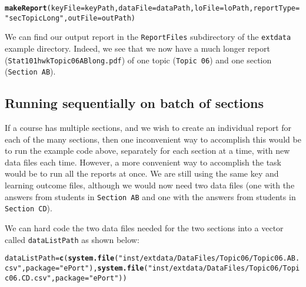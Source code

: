 \documentclass{article}\usepackage[]{graphicx}\usepackage[]{color}
\makeatletter
\newcommand{\hlstr}[1]{\textcolor[rgb]{0.192,0.494,0.8}{#1}}%
\newcommand{\hlstd}[1]{\textcolor[rgb]{0.345,0.345,0.345}{#1}}%
\newcommand{\hlkwb}[1]{\textcolor[rgb]{0.69,0.353,0.396}{#1}}%
\newcommand{\hlkwc}[1]{\textcolor[rgb]{0.333,0.667,0.333}{#1}}%
\newcommand{\hlkwd}[1]{\textcolor[rgb]{0.737,0.353,0.396}{\textbf{#1}}}%
\newenvironment{kframe}{%
 \def\at@end@of@kframe{}%
 \ifinner\ifhmode%
  \def\at@end@of@kframe{\end{minipage}}%
  \begin{minipage}{\columnwidth}%
 \fi\fi%
 \def\FrameCommand##1{\hskip\@totalleftmargin \hskip-\fboxsep
 \colorbox{shadecolor}{##1}\hskip-\fboxsep
     \hskip-\linewidth \hskip-\@totalleftmargin \hskip\columnwidth}%
 \MakeFramed {\advance\hsize-\width
   \@totalleftmargin\z@ \linewidth\hsize
   \@setminipage}}%
 {\par\unskip\endMakeFramed%
 \at@end@of@kframe}
\newenvironment{knitrout}{}{} %
\numberwithin{equation}{section} %
\makeatother
\begin{document}
\begin{knitrout}
\color{fgcolor}\begin{kframe}
\begin{alltt}
\hlkwd{makeReport}\hlstd{(}\hlkwc{keyFile}\hlstd{=keyPath,}\hlkwc{dataFile}\hlstd{=dataPath,}\hlkwc{loFile}\hlstd{=loPath,}\hlkwc{reportType}\hlstd{=}\hlstr{"secTopicLong"}\hlstd{,}\hlkwc{outFile}\hlstd{=outPath)}
\end{alltt}
\end{kframe}
\end{knitrout}

We can find our output report in the \texttt{ReportFiles} subdirectory of the \texttt{extdata} example directory. Indeed, we see that we now have a much longer report (\texttt{Stat101hwkTopic06ABlong.pdf}) of one topic (\texttt{Topic 06}) and one section (\texttt{Section AB}).

\subsection{Running sequentially on batch of sections}
\label{sec:sequential}

If a course has multiple sections, and we wish to create an individual report for each of the many sections, then one inconvenient way to accomplish this would be to run the example code above, separately for each section at a time, with new data files each time. However, a more convenient way to accomplish the task would be to run all the reports at once. We are still using the same key and learning outcome files, although we would now need two data files (one with the answers from students in \texttt{Section AB} and one with the answers from students in \texttt{Section CD}).

We can hard code the two data files needed for the two sections into a vector called \texttt{dataListPath} as shown below:

\begin{knitrout}
\color{fgcolor}\begin{kframe}
\begin{alltt}
\hlstd{dataListPath} \hlkwb{=} \hlkwd{c}\hlstd{(}\hlkwd{system.file}\hlstd{(}\hlstr{"inst/extdata/DataFiles/Topic06/Topic06.AB.csv"}\hlstd{,} \hlkwc{package}\hlstd{=}\hlstr{"ePort"}\hlstd{),} \hlkwd{system.file}\hlstd{(}\hlstr{"inst/extdata/DataFiles/Topic06/Topic06.CD.csv"}\hlstd{,} \hlkwc{package}\hlstd{=}\hlstr{"ePort"}\hlstd{))}
\end{alltt}
\end{kframe}
\end{knitrout}
\end{document}
